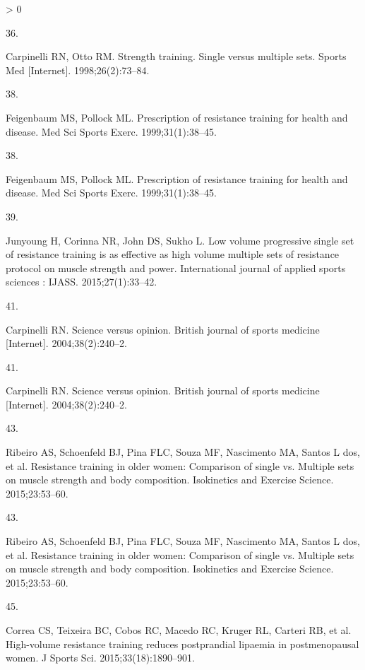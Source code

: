 \documentclass[twoside,10pt]{gihclass} %
\newlength{\cslhangindent}
\newlength{\csllabelwidth}
\newenvironment{CSLReferences}[3] %
 {%
  \setlength{\parindent}{0pt}
  \ifodd #1 \everypar{\setlength{\hangindent}{\cslhangindent}}\ignorespaces\fi
  \ifnum #2 > 0
  \setlength{\parskip}{#2\baselineskip}
  \fi
 }%
 {}
\newcommand{\CSLLeftMargin}[1]{\parbox[t]{\maxof{\widthof{#1}}{\csllabelwidth}}{#1}}
\newcommand{\CSLRightInline}[1]{\parbox[t]{\linewidth}{#1}}
\begin{document}
\begin{CSLReferences}{0}{0}
\leavevmode\hypertarget{ref-RN794}{}%
\CSLLeftMargin{36. }
\CSLRightInline{Carpinelli RN, Otto RM. Strength training. Single versus multiple sets. Sports Med {[}Internet{]}. 1998;26(2):73--84. }

\leavevmode\hypertarget{ref-RN2538}{}%
\CSLLeftMargin{38. }
\CSLRightInline{Feigenbaum MS, Pollock ML. Prescription of resistance training for health and disease. Med Sci Sports Exerc. 1999;31(1):38--45. }

\leavevmode\hypertarget{ref-RN2538}{}%
\CSLLeftMargin{38. }
\CSLRightInline{Feigenbaum MS, Pollock ML. Prescription of resistance training for health and disease. Med Sci Sports Exerc. 1999;31(1):38--45. }

\leavevmode\hypertarget{ref-RN2568}{}%
\CSLLeftMargin{39. }
\CSLRightInline{Junyoung H, Corinna NR, John DS, Sukho L. Low volume progressive single set of resistance training is as effective as high volume multiple sets of resistance protocol on muscle strength and power. International journal of applied sports sciences : IJASS. 2015;27(1):33--42. }

\leavevmode\hypertarget{ref-RN2201}{}%
\CSLLeftMargin{41. }
\CSLRightInline{Carpinelli RN. Science versus opinion. British journal of sports medicine {[}Internet{]}. 2004;38(2):240--2. }

\leavevmode\hypertarget{ref-RN2201}{}%
\CSLLeftMargin{41. }
\CSLRightInline{Carpinelli RN. Science versus opinion. British journal of sports medicine {[}Internet{]}. 2004;38(2):240--2. }

\leavevmode\hypertarget{ref-RN2465}{}%
\CSLLeftMargin{43. }
\CSLRightInline{Ribeiro AS, Schoenfeld BJ, Pina FLC, Souza MF, Nascimento MA, Santos L dos, et al. Resistance training in older women: Comparison of single vs. Multiple sets on muscle strength and body composition. Isokinetics and Exercise Science. 2015;23:53--60. }

\leavevmode\hypertarget{ref-RN2465}{}%
\CSLLeftMargin{43. }
\CSLRightInline{Ribeiro AS, Schoenfeld BJ, Pina FLC, Souza MF, Nascimento MA, Santos L dos, et al. Resistance training in older women: Comparison of single vs. Multiple sets on muscle strength and body composition. Isokinetics and Exercise Science. 2015;23:53--60. }

\leavevmode\hypertarget{ref-RN2464}{}%
\CSLLeftMargin{45. }
\CSLRightInline{Correa CS, Teixeira BC, Cobos RC, Macedo RC, Kruger RL, Carteri RB, et al. High-volume resistance training reduces postprandial lipaemia in postmenopausal women. J Sports Sci. 2015;33(18):1890--901. }


\end{CSLReferences}
\end{document}
